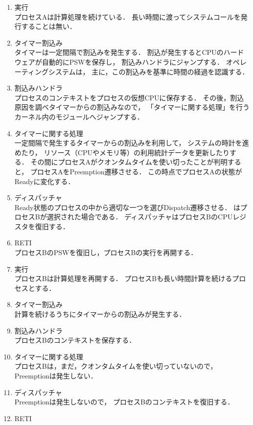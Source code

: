 \begin{enumerate}
\item 実行 \\
  プロセスAは計算処理を続けている．
  長い時間に渡ってシステムコールを発行することは無い．
\item タイマー割込み \\
  タイマーは一定間隔で割込みを発生する．
  割込が発生するとCPUのハードウェアが自動的にPSWを保存し，
  割込みハンドラにジャンプする．
  オペレーティングシステムは，
  主に，この割込みを基準に時間の経過を認識する．
\item 割込みハンドラ \\
  プロセスのコンテキストをプロセスの仮想CPUに保存する．
  その後，割込原因を調べタイマーからの割込みなので，
  「タイマーに関する処理」を行うカーネル内のモジュールへジャンプする．
\item タイマーに関する処理 \\
  一定間隔で発生するタイマーからの割込みを利用して，
  システムの時計を進めたり，
  リソース（CPUやメモリ等）の利用統計データを更新したりする．
  その間にプロセスAがクオンタムタイムを使い切ったことが判明すると，
  プロセスAをPreemption遷移させる．
  この時点でプロセスAの状態がReadyに変化する．
\item ディスパッチャ \\
  Ready状態のプロセスの中から適切な一つを選びDispatch遷移させる．
  はプロセスBが選択された場合である．
  ディスパッチャはプロセスBのCPUレジスタを復旧する．
\item RETI \\
  プロセスBのPSWを復旧し，プロセスBの実行を再開する．
\item 実行 \\
  プロセスBは計算処理を再開する．
  プロセスBも長い時間計算を続けるプロセスとする．
\item タイマー割込み \\
  計算を続けるうちにタイマーからの割込みが発生する．
\item 割込みハンドラ \\
  プロセスBのコンテキストを保存する．
\item タイマーに関する処理 \\
  プロセスBは，まだ，クオンタムタイムを使い切っていないので，
  Preemptionは発生しない．
\item ディスパッチャ \\
  Preemptionは発生しないので，
  プロセスBのコンテキストを復旧する．
\item RETI \\

\end{enumerate}
